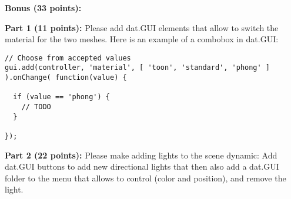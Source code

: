 \documentclass[10pt,oneside,onecolumn,letterpaper]{article}
\begin{document}
\noindent\textbf{Bonus (33 points):}

\vspace{.5cm}

\noindent\textbf{Part 1 (11 points):} Please add dat.GUI elements that allow to switch the material for the two meshes. Here is an example of a combobox in dat.GUI:

\vspace{.5cm}

\begin{verbatim}
// Choose from accepted values
gui.add(controller, 'material', [ 'toon', 'standard', 'phong' ] ).onChange( function(value) {
  
  if (value == 'phong') {
    // TODO
  }

});
\end{verbatim}

\vspace{.5cm}

\noindent\textbf{Part 2 (22 points):} Please make adding lights to the scene dynamic: Add dat.GUI buttons to add new directional lights that then also add a dat.GUI folder to the menu that allows to control (color and position), and remove the light.
\end{document}
